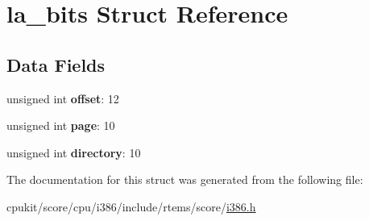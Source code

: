 \hypertarget{structla__bits}{}\section{la\+\_\+bits Struct Reference}
\label{structla__bits}
\subsection*{Data Fields}
\begin{DoxyCompactItemize}
\item 
\mbox{\label{structla__bits_a94164522f8f4f0b689789ee45243f275}} 
unsigned int {\bfseries offset}\+: 12
\item 
\mbox{\label{structla__bits_a34404ce2e2019b3d0c62ef5ba9963096}} 
unsigned int {\bfseries page}\+: 10
\item 
\mbox{\label{structla__bits_a55b0b215ca0aabc7b5c36de49bd6d77d}} 
unsigned int {\bfseries directory}\+: 10
\end{DoxyCompactItemize}


The documentation for this struct was generated from the following file\+:\begin{DoxyCompactItemize}
\item 
cpukit/score/cpu/i386/include/rtems/score/\mbox{\hyperlink{i386_8h}{i386.\+h}}\end{DoxyCompactItemize}
